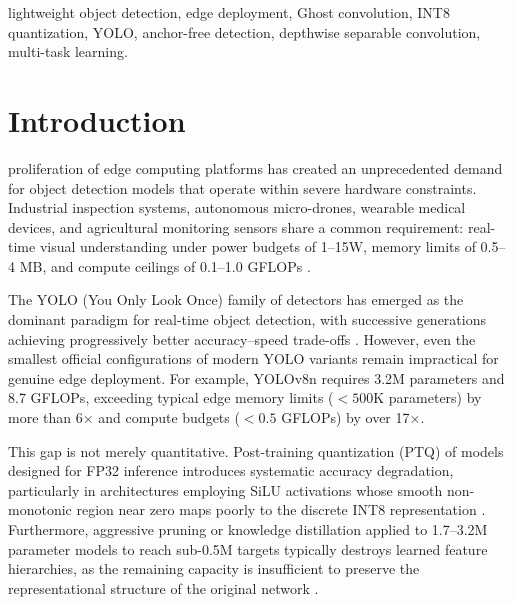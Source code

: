 \documentclass[conference]{IEEEtran}
\begin{document}
\begin{IEEEkeywords}
lightweight object detection, edge deployment, Ghost convolution, INT8 quantization, YOLO, anchor-free detection, depthwise separable convolution, multi-task learning.
\end{IEEEkeywords}

\section{Introduction}
 proliferation of edge computing platforms has created an unprecedented demand for object detection models that operate within severe hardware constraints. Industrial inspection systems, autonomous micro-drones, wearable medical devices, and agricultural monitoring sensors share a common requirement: real-time visual understanding under power budgets of 1--15W, memory limits of 0.5--4 MB, and compute ceilings of 0.1--1.0 GFLOPs \cite{zhou2019edge, li2020edge}.

The YOLO (You Only Look Once) family of detectors has emerged as the dominant paradigm for real-time object detection, with successive generations achieving progressively better accuracy--speed trade-offs \cite{redmon2016you, redmon2017yolo9000, redmon2018yolov3, bochkovskiy2020yolov4, ge2021yolox, li2022yolov6, wang2023yolov7, jocher2023yolov8, wang2024yolov10, tian2025yolo12, shao2025yolo26}. However, even the smallest official configurations of modern YOLO variants remain impractical for genuine edge deployment. For example, YOLOv8n requires 3.2M parameters and 8.7 GFLOPs, exceeding typical edge memory limits ($<500$K parameters) by more than 6$\times$ and compute budgets ($<0.5$ GFLOPs) by over 17$\times$.

This gap is not merely quantitative. Post-training quantization (PTQ) of models designed for FP32 inference introduces systematic accuracy degradation, particularly in architectures employing SiLU activations whose smooth non-monotonic region near zero maps poorly to the discrete INT8 representation \cite{krishnamoorthi2018quantizing, nagel2021white}. Furthermore, aggressive pruning or knowledge distillation applied to 1.7--3.2M parameter models to reach sub-0.5M targets typically destroys learned feature hierarchies, as the remaining capacity is insufficient to preserve the representational structure of the original network \cite{liu2019rethinking, he2019filter}.
\end{document}
